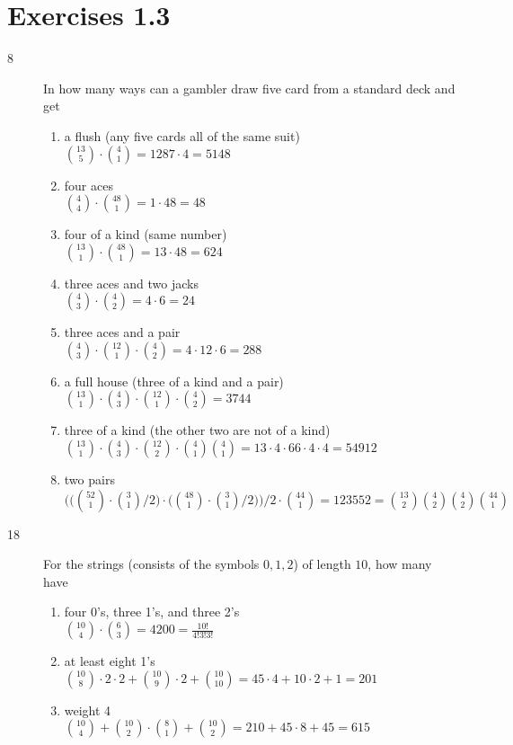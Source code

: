 \documentclass[a4paper]{article}
\begin{document}
\section*{Exercises 1.3}
\begin{description}
\item[8]
In how many ways can a gambler draw five card from a standard deck and get
    \begin{enumerate}[label=(\alph*)]
      \item a flush (any five cards all of the same suit)\\
      $ \binom{13}{5}\cdot\binom{4}{1}=1287\cdot 4=5148 $
      \item four aces\\
      $ \binom{4}{4}\cdot\binom{48}{1}=1\cdot 48=48$
      \item four of a kind (same number)\\
      $\binom{13}{1}\cdot\binom{48}{1}=13\cdot 48=624$
      \item three aces and two jacks\\
      $ \binom{4}{3}\cdot\binom{4}{2}=4\cdot6=24$
      \item three aces and a pair\\
      $\binom{4}{3}\cdot\binom{12}{1}\cdot\binom{4}{2}=4\cdot12\cdot6=288$
      \item a full house (three of a kind and a pair)\\
      $\binom{13}{1}\cdot\binom{4}{3}\cdot\binom{12}{1}\cdot\binom{4}{2}=3744$
      \item three of a kind (the other two are not of a kind)\\
      $\binom{13}{1}\cdot\binom{4}{3}\cdot\binom{12}{2}\cdot\binom{4}{1}\binom{4}{1}=13\cdot4\cdot66\cdot 4\cdot 4=54912$
      \item two pairs\\
      $\bigg(\Big(\binom{52}{1}\cdot\binom{3}{1}/2\Big)\cdot\Big(\binom{48}{1}\cdot\binom{3}{1}/2\Big)\bigg)/2\cdot\binom{44}{1}=123552=\binom{13}{2}\binom{4}{2}\binom{4}{2}\binom{44}{1}$
    \end{enumerate}

\item[18]
For the strings (consists of the symbols $0,1,2$) of length $10$, how many have
    \begin{enumerate}[label=(\alph*)]
      \item four 0's, three 1's, and three 2's\\
      $ \binom{10}{4}\cdot\binom{6}{3} =4200=\frac{10!}{4!3!3!}$
      \item at least eight 1's\\
      $\binom{10}{8}\cdot2\cdot2+\binom{10}{9}\cdot2+\binom{10}{10}=45\cdot4+10\cdot2+1=201$
      \item weight 4\\
      $\binom{10}{4}+\binom{10}{2}\cdot\binom{8}{1}+\binom{10}{2}=210+ 45\cdot 8+45=615$
    \end{enumerate}


\end{description}
\end{document}
